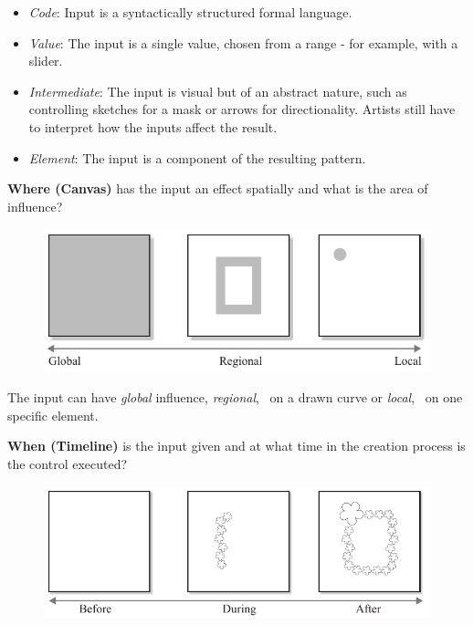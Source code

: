 \begin{itemize}
    \item \textit{Code}: Input is a syntactically structured formal language.
    \item \textit{Value}: The input is a single value, chosen from a range - for example, with a slider.
    \item \textit{Intermediate}: The input is visual but of an abstract nature, such as controlling sketches for a mask or arrows for directionality. Artists still have to interpret how the inputs affect the result.
    \item \textit{Element}: The input is a component of the resulting pattern.
\end{itemize}

\noindent\textbf{Where (Canvas)} has the input an effect spatially and what is the area of influence? 
\begin{figure}[hbt]
    \centering
        \includegraphics[width=\controlParamsFigWidth\linewidth]{figures/control_paradigms/where.pdf}
\end{figure}

The input can have \textit{global} influence, \textit{regional}, \eg~on a drawn curve or \textit{local}, \eg~on one specific element.



\textbf{When (Timeline)} is the input given and at what time in the creation process is the control executed? 
\begin{figure}[H]
    \centering
        \includegraphics[width=\controlParamsFigWidth\linewidth]{figures/control_paradigms/when.pdf}
\end{figure}

